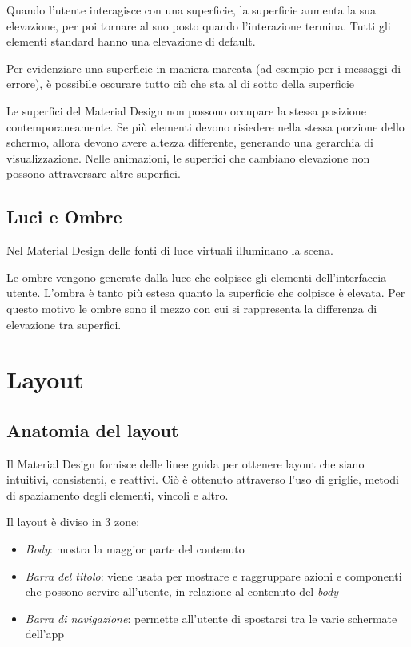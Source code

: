 \documentclass[12pt, a4paper]{report}
\begin{document}
		Quando l'utente interagisce con una superficie, la superficie aumenta la sua elevazione, per poi tornare al suo posto quando l'interazione termina. Tutti gli elementi standard hanno una elevazione di default.

		Per evidenziare una superficie in maniera marcata (ad esempio per i messaggi di errore), è possibile oscurare tutto ciò che sta al di sotto della superficie
	
		Le superfici del Material Design non possono occupare la stessa posizione contemporaneamente. Se più elementi devono risiedere nella stessa porzione dello schermo, allora devono avere altezza differente, generando una gerarchia di visualizzazione. Nelle animazioni, le superfici che cambiano elevazione non possono attraversare altre superfici.

		\subsection{Luci e Ombre}
		Nel Material Design delle fonti di luce virtuali illuminano la scena.
		
		Le ombre vengono generate dalla luce che colpisce gli elementi dell'interfaccia utente. L'ombra è tanto più estesa quanto la superficie che colpisce è elevata. Per questo motivo le ombre sono il mezzo con cui si rappresenta la differenza di elevazione tra superfici.


	\section{Layout}
		
		\subsection{Anatomia del layout}
		Il Material Design fornisce delle linee guida per ottenere layout che siano intuitivi, consistenti, e reattivi. Ciò è ottenuto attraverso l'uso di griglie, metodi di spaziamento degli elementi, vincoli e altro.\cite{layout_start}

		Il layout è diviso in 3 zone:
		\begin{itemize}
			\item \textit{Body}: mostra la maggior parte del contenuto
			\item \textit{Barra del titolo}: viene usata per mostrare e raggruppare azioni e componenti che
		possono servire all’utente, in relazione al contenuto del \textit{body}
			\item \textit{Barra di navigazione}: permette all'utente di spostarsi tra le varie schermate dell'app
		\end{itemize}
\end{document}
